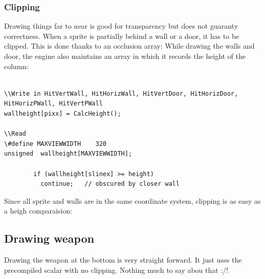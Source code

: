 \subsubsection{Clipping}
Drawing things far to near is good for transparency but does not guaranty correctness. When a sprite is partially behind a wall or a door, it has to be clipped. This is done thanks to an occlusion array: While drawing the walls and door, the engine also maintains an array in which it records the height of the column:\\
\par
\begin{verbatim}

\\Write in HitVertWall, HitHorizWall, HitVertDoor, HitHorizDoor, HitHorizPWall, HitVertPWall
wallheight[pixx] = CalcHeight();

\\Read
\#define MAXVIEWWIDTH    320
unsigned  wallheight[MAXVIEWWIDTH];

        if (wallheight[slinex] >= height)
          continue;   // obscured by closer wall
\end{verbatim}
\par
Since all sprite and walls are in the same coordinate system, clipping is as easy as a heigh comparaision:\\
















\subsection{Drawing weapon}
Drawing the weapon at the bottom is very straight forward. It just uses the precompiled scalar with no clipping. Nothing much to say abou that :/!\\






